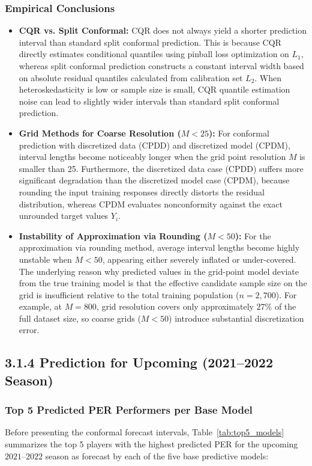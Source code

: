 \documentclass[11pt,a4paper]{article}
\begin{document}
\subsubsection{Empirical Conclusions}
\begin{itemize}
    \item \textbf{CQR vs. Split Conformal:} CQR does not always yield a shorter prediction interval than standard split conformal prediction. This is because CQR directly estimates conditional quantiles using pinball loss optimization on $L_1$, whereas split conformal prediction constructs a constant interval width based on absolute residual quantiles calculated from calibration set $L_2$. When heteroskedasticity is low or sample size is small, CQR quantile estimation noise can lead to slightly wider intervals than standard split conformal prediction.
    \item \textbf{Grid Methods for Coarse Resolution ($M < 25$):} For conformal prediction with discretized data (CPDD) and discretized model (CPDM), interval lengths become noticeably longer when the grid point resolution $M$ is smaller than 25. Furthermore, the discretized data case (CPDD) suffers more significant degradation than the discretized model case (CPDM), because rounding the input training responses directly distorts the residual distribution, whereas CPDM evaluates nonconformity against the exact unrounded target values $Y_i$.
    \item \textbf{Instability of Approximation via Rounding ($M < 50$):} For the approximation via rounding method, average interval lengths become highly unstable when $M < 50$, appearing either severely inflated or under-covered. The underlying reason why predicted values in the grid-point model deviate from the true training model is that the effective candidate sample size on the grid is insufficient relative to the total training population ($n = 2,700$). For example, at $M = 800$, grid resolution covers only approximately $27\%$ of the full dataset size, so coarse grids ($M < 50$) introduce substantial discretization error.
\end{itemize}

\subsection{3.1.4 Prediction for Upcoming (2021--2022 Season)}

\subsubsection{Top 5 Predicted PER Performers per Base Model}
Before presenting the conformal forecast intervals, Table~\ref{tab:top5_models} summarizes the top 5 players with the highest predicted PER for the upcoming $2021$--$2022$ season as forecast by each of the five base predictive models:
\end{document}
